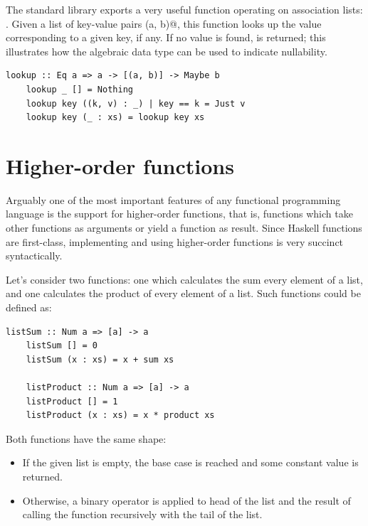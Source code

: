 \documentclass[UdineBachThesis,american,11pt]{PhdThesis}
\begin{document}
  The standard library exports a very useful function operating on association
  lists: \lstinline@lookup@. Given a list of key-value pairs \lstinline@(a, b)@,
  this function looks up the value corresponding to a given key, if any. If no
  value is found, \lstinline@Nothing@ is returned; this illustrates how the
  algebraic data type \lstinline@Maybe@ can be used to indicate nullability.

  \begin{lstlisting}[gobble=4,basicstyle=\ttfamily\small]
    lookup :: Eq a => a -> [(a, b)] -> Maybe b
    lookup _ [] = Nothing
    lookup key ((k, v) : _) | key == k = Just v
    lookup key (_ : xs) = lookup key xs
  \end{lstlisting}

  \section{Higher-order functions}

  Arguably one of the most important features of any functional programming
  language is the support for higher-order functions, that is, functions which
  take other functions as arguments or yield a function as result. Since Haskell
  functions are first-class, implementing and using higher-order functions is
  very succinct syntactically.

  \pagebreak

  Let's consider two functions: one which calculates the sum every element of a
  list, and one calculates the product of every element of a list. Such
  functions could be defined as:

  \begin{lstlisting}[gobble=4,basicstyle=\ttfamily\small]
    listSum :: Num a => [a] -> a
    listSum [] = 0
    listSum (x : xs) = x + sum xs

    listProduct :: Num a => [a] -> a
    listProduct [] = 1
    listProduct (x : xs) = x * product xs
  \end{lstlisting}

  Both functions have the same shape:

  \begin{itemize}
    \item If the given list is empty, the base case is reached and some constant
    value is returned.

    \item Otherwise, a binary operator is applied to head of the list and the
    result of calling the function recursively with the tail of the list.
  \end{itemize}
\end{document}

